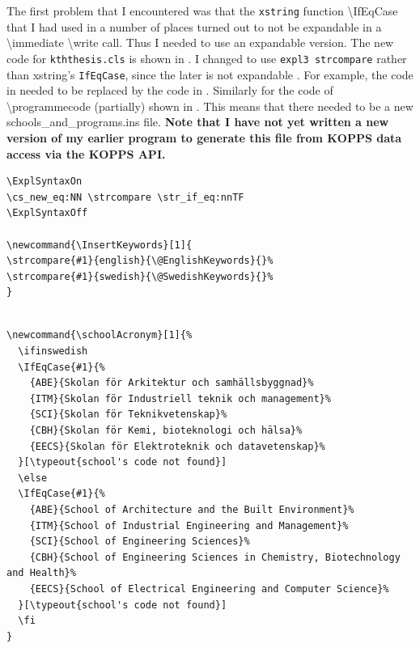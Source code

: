 The first problem that I encountered was that the \texttt{xstring} function \textbackslash IfEqCase that I had used in a number of places turned out to not be expandable in a \textbackslash immediate \textbackslash write call. Thus I needed to use an expandable version. The new code for \texttt{kththesis.cls} is shown in . I changed to use \texttt{expl3 strcompare} rather than xstring's \texttt{IfEqCase}, since the later is not expandable . For example, the code in  needed to be replaced by the code in . Similarly for the code of \textbackslash programmecode (partially) shown in . This means that there needed to be a new schools\_and\_programs.ins file. \textbf{Note that I have not yet written a new version of my earlier program to generate this file from KOPPS data access via the KOPPS API.}
\begin{lstlisting}[language={[LaTeX]TeX}, caption={New version of \textbackslash InsertKeywords together with making the expl3 \textbackslash strcompare function available}, label=lst:InsertKeywords]
\ExplSyntaxOn
\cs_new_eq:NN \strcompare \str_if_eq:nnTF
\ExplSyntaxOff

\newcommand{\InsertKeywords}[1]{
\strcompare{#1}{english}{\@EnglishKeywords}{}%
\strcompare{#1}{swedish}{\@SwedishKeywords}{}%
}
\end{lstlisting}

\begin{lstlisting}[language={[LaTeX]TeX}, caption={Original \textbackslash schoolAcronym}, label=lst:originalSchoolAcronym] 
	
\newcommand{\schoolAcronym}[1]{%
  \ifinswedish
  \IfEqCase{#1}{%
    {ABE}{Skolan för Arkitektur och samhällsbyggnad}%
    {ITM}{Skolan för Industriell teknik och management}%
    {SCI}{Skolan för Teknikvetenskap}%
    {CBH}{Skolan för Kemi, bioteknologi och hälsa}%
    {EECS}{Skolan för Elektroteknik och datavetenskap}%
  }[\typeout{school's code not found}]
  \else
  \IfEqCase{#1}{%
    {ABE}{School of Architecture and the Built Environment}%
    {ITM}{School of Industrial Engineering and Management}%
    {SCI}{School of Engineering Sciences}%
    {CBH}{School of Engineering Sciences in Chemistry, Biotechnology and Health}%
    {EECS}{School of Electrical Engineering and Computer Science}%
  }[\typeout{school's code not found}]
  \fi
}
\end{lstlisting}

